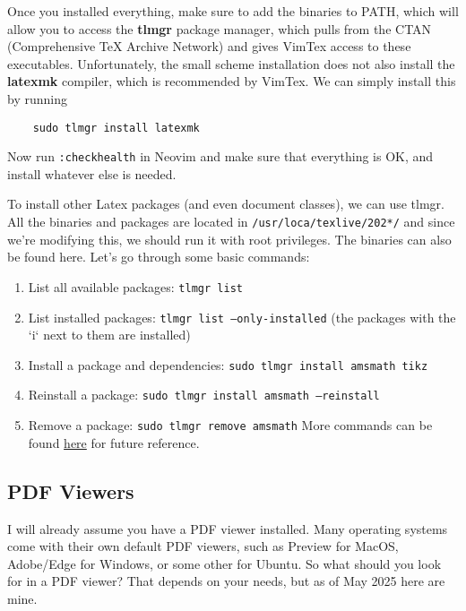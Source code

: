   Once you installed everything, make sure to add the binaries to PATH, which will allow you to access the \textbf{tlmgr} package manager, which pulls from the CTAN (Comprehensive TeX Archive Network) and gives VimTex access to these executables. Unfortunately, the small scheme installation does not also install the \textbf{latexmk} compiler, which is recommended by VimTex. We can simply install this by running 

  \begin{lstlisting}
    sudo tlmgr install latexmk
  \end{lstlisting}

  Now run \texttt{:checkhealth} in Neovim and make sure that everything is OK, and install whatever else is needed. 

  To install other Latex packages (and even document classes), we can use tlmgr. All the binaries and packages are located in \texttt{/usr/loca/texlive/202*/} and since we're modifying this, we should run it with root privileges. The binaries can also be found here. Let's go through some basic commands: 
  \begin{enumerate}
    \item List all available packages: \texttt{tlmgr list}
    \item List installed packages: \texttt{tlmgr list --only-installed} (the packages with the `i` next to them are installed)
    \item Install a package and dependencies: \texttt{sudo tlmgr install amsmath tikz} 
    \item Reinstall a package: \texttt{sudo tlmgr install amsmath --reinstall}
    \item Remove a package: \texttt{sudo tlmgr remove amsmath} 
  More commands can be found \href{http://tug.ctan.org/info/tlmgrbasics/doc/tlmgr.pdf}{here} for future reference.  
  \end{enumerate}

\subsection{PDF Viewers}

  I will already assume you have a PDF viewer installed. Many operating systems come with their own default PDF viewers, such as Preview for MacOS, Adobe/Edge for Windows, or some other for Ubuntu. So what should you look for in a PDF viewer? That depends on your needs, but as of May 2025 here are mine. 

